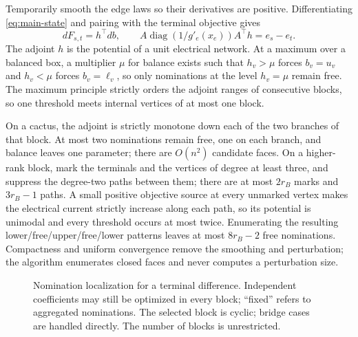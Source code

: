 Temporarily smooth the edge laws so their derivatives are positive.
Differentiating \eqref{eq:main-state} and pairing with the terminal
objective gives
\begin{equation}
 dF_{s,t}=h^\top db,\qquad
 A\operatorname{diag}(1/g'_e(x_e))A^\top h=e_s-e_t.
 \label{eq:main-adjoint}
\end{equation}
The adjoint $h$ is the potential of a unit electrical network. At a
maximum over a balanced box, a multiplier $\mu$ for balance exists such
that $h_v>\mu$ forces $b_v=u_v$ and $h_v<\mu$ forces $b_v=\ell_v$, so
only nominations at the level $h_v=\mu$ remain free. The maximum
principle strictly orders the adjoint ranges of consecutive blocks, so
one threshold meets internal vertices of at most one block.

On a cactus, the adjoint is strictly monotone down each of the two
branches of that block. At most two nominations remain free, one on
each branch, and balance leaves one parameter; there are $O(n^2)$
candidate faces. On a higher-rank block, mark the terminals and the
vertices of degree at least three, and suppress the degree-two paths
between them; there are at most $2r_B$ marks and $3r_B-1$ paths. A small
positive objective source at every unmarked vertex makes the electrical
current strictly increase along each path, so its potential is unimodal
and every threshold occurs at most twice. Enumerating the resulting
lower/free/upper/free/lower patterns leaves at most $8r_B-2$ free
nominations. Compactness and uniform convergence remove the smoothing
and perturbation; the algorithm enumerates closed faces and never
computes a perturbation size.

\begin{figure}[tb]
\centering
{}
\caption{Nomination localization for a terminal difference. Independent
coefficients may still be optimized in every block; ``fixed'' refers to
aggregated nominations. The selected block is cyclic; bridge cases
are handled directly. The number of blocks is unrestricted.}
\label{fig:main-localization}
\end{figure}

